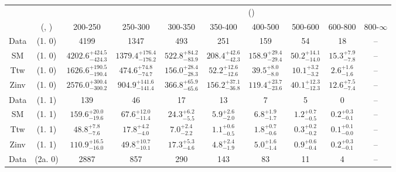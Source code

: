 \begin{table}[h!]
\tiny
\centering
{}
\begin{tabular}
{cccccccccc}
	\hline\hline
&	&	& \multicolumn{8}{c}{\scalht (\gev)}\\ 
	&	 (\njet, \nb) & 200-250 & 250-300 & 300-350 & 350-400 & 400-500 & 500-600 & 600-800 & 800-$\infty$ \\ [0.8ex] 
\hline
	Data & (1. 0) & 4199 & 1347 & 493 & 251 & 159 & 54 & 18 & -- \\[0.5ex] 
	SM & (1. 0) & $4202.6^{+ 424.5 }_{- 424.3 }$ & $1379.4^{+ 176.4 }_{- 176.2 }$ & $522.8^{+ 84.2 }_{- 83.9 }$ & $208.4^{+ 42.6 }_{- 42.3 }$ & $158.9^{+ 29.4 }_{- 29.4 }$ & $50.2^{+ 14.1 }_{- 14.0 }$ & $15.3^{+ 7.9 }_{- 7.8 }$ & -- \\[0.5ex] 
	Ttw & (1. 0) & $1626.6^{+ 190.5 }_{- 190.4 }$ & $474.6^{+ 74.8 }_{- 74.7 }$ & $156.0^{+ 28.4 }_{- 28.3 }$ & $52.2^{+ 12.6 }_{- 12.6 }$ & $39.5^{+ 8.0 }_{- 8.0 }$ & $10.1^{+ 3.2 }_{- 3.2 }$ & $2.6^{+ 1.6 }_{- 1.6 }$ & -- \\[0.5ex] 
	Zinv & (1. 0) & $2576.0^{+ 300.4 }_{- 300.2 }$ & $904.9^{+ 141.6 }_{- 141.4 }$ & $366.8^{+ 65.9 }_{- 65.6 }$ & $156.2^{+ 37.1 }_{- 36.8 }$ & $119.4^{+ 23.7 }_{- 23.6 }$ & $40.1^{+ 12.3 }_{- 12.3 }$ & $12.6^{+ 7.5 }_{- 7.4 }$ & -- \\[0.5ex] 
	Data & (1. 1) & 139 & 46 & 17 & 13 & 7 & 5 & 0 & -- \\[0.5ex] 
	SM & (1. 1) & $159.6^{+ 20.0 }_{- 19.6 }$ & $67.6^{+ 12.0 }_{- 11.4 }$ & $24.3^{+ 6.2 }_{- 5.5 }$ & $5.9^{+ 2.6 }_{- 2.0 }$ & $6.8^{+ 1.9 }_{- 1.7 }$ & $1.2^{+ 0.7 }_{- 0.5 }$ & $0.2^{+ 0.3 }_{- 0.1 }$ & -- \\[0.5ex] 
	Ttw & (1. 1) & $48.8^{+ 7.8 }_{- 7.6 }$ & $17.8^{+ 4.2 }_{- 4.0 }$ & $7.0^{+ 2.4 }_{- 2.2 }$ & $1.1^{+ 0.6 }_{- 0.5 }$ & $1.8^{+ 0.7 }_{- 0.6 }$ & $0.3^{+ 0.2 }_{- 0.2 }$ & $0.1^{+ 0.1 }_{- 0.0 }$ & -- \\[0.5ex] 
	Zinv & (1. 1) & $110.9^{+ 16.5 }_{- 16.0 }$ & $49.8^{+ 10.7 }_{- 10.1 }$ & $17.3^{+ 5.3 }_{- 4.6 }$ & $4.8^{+ 2.4 }_{- 1.9 }$ & $5.0^{+ 1.6 }_{- 1.4 }$ & $0.9^{+ 0.6 }_{- 0.4 }$ & $0.2^{+ 0.3 }_{- 0.1 }$ & -- \\[0.5ex] 
	Data & (2a. 0) & 2887 & 857 & 290 & 143 & 83 & 11 & 4 & -- \\[0.5ex] 

\end{tabular}
\end{table}
